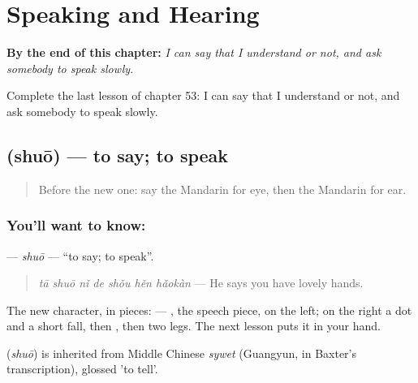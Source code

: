 
\chapter{Speaking and Hearing}
\label{ch:zh-speaking-and-hearing}

\begin{chapteropening}
\textbf{By the end of this chapter:} \emph{I can say that I understand or not, and ask somebody to speak slowly.}

Complete the last lesson of chapter 53: I can say that I understand or not, and ask somebody to speak slowly.
\end{chapteropening}

\section[\texorpdfstring{\zh{说} (shuō)}{说 (shuō)}]{ (shuō) — to say; to speak}

\label{lesson:ZH-C53-shuo}



\begin{quote}
Before the new one: say the Mandarin for eye, then the Mandarin for ear.
\end{quote}

\subsection*{You'll want to know: }
\textbf{} — \emph{shuō} — \textquotedblleft{}to say; to speak\textquotedblright{}.

\begin{quote}
\textbf{} \emph{tā shuō nǐ de shǒu hěn hǎokàn} — He says you have lovely hands.
\end{quote}

The new character, in pieces:  — , the speech piece, on the left; on the right a dot and a short fall, then , then two legs. The next lesson puts it in your hand.

\begin{cousinweb}
\textbf{} (\emph{shuō}) is inherited from Middle Chinese \emph{sywet} (Guangyun, in Baxter's transcription), glossed 'to tell'.
\end{cousinweb}

